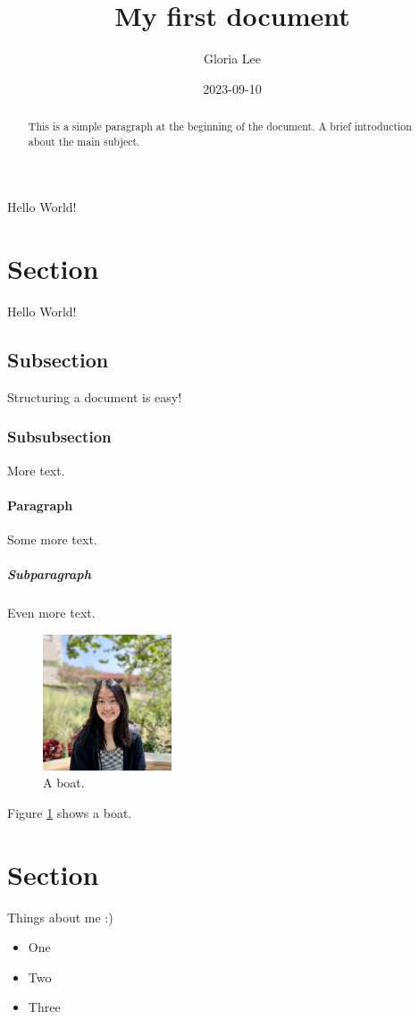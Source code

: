 \documentclass{article}
\title{My first document}
\date{2023-09-10}
\author{Gloria Lee}
\begin{document}
  \maketitle
  \newpage
  
  Hello World!

  \begin{abstract}
    This is a simple paragraph at the beginning of the 
    document. A brief introduction about the main subject.
  \end{abstract}

  \section{Section}
  Hello World!
  \subsection{Subsection}
  Structuring a document is easy!
  \subsubsection{Subsubsection}
  More text.
  \paragraph{Paragraph}
  Some more text.
  \subparagraph{Subparagraph}
  Even more text.

  
  \begin{figure}[hbt!]
    \begin{centering}
    \includegraphics[width=1.5in]{gloriagoeun-01.png}
    \caption{A boat.}
    \label{fig:boat1}
    \end{centering}
  \end{figure}
  Figure \ref{fig:boat1} shows a boat.
  
  \section{Section}
  Things about me :)
    \begin{itemize}
      \item One
      \item Two
      \item Three
    \end{itemize}
\end{document}
